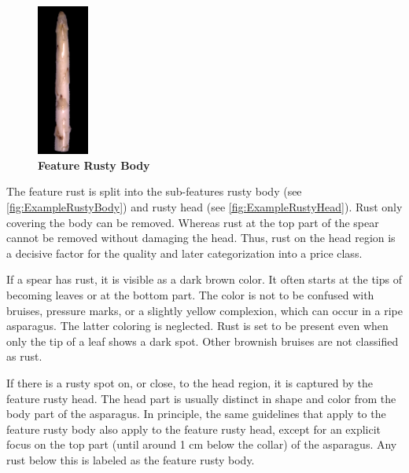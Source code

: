 \begin{figure}
  \begin{center}
    \includegraphics[width=0.15\textwidth]{Figures/chapter03/example_img_rustybody.png}
  \end{center}
  \vspace{-15pt}
  \caption[Example Image Feature Rusty Body]{ \textbf{Feature Rusty Body}}
  \vspace{15pt}
  \label{fig:ExampleRustyBody}
\end{figure}

The feature rust is split into the sub-features rusty body (see \autoref{fig:ExampleRustyBody}) and rusty head (see \autoref{fig:ExampleRustyHead}). Rust only covering the body can be removed. Whereas rust at the top part of the spear cannot be removed without damaging the head. Thus, rust on the head region is a decisive factor for the quality and later categorization into a price class.

If a spear has rust, it is visible as a dark brown color. It often starts at the tips of becoming leaves or at the bottom part. The color is not to be confused with bruises, pressure marks, or a slightly yellow complexion, which can occur in a ripe asparagus. The latter coloring is neglected.
Rust is set to be present even when only the tip of a leaf shows a dark spot. Other brownish bruises are not classified as rust.

If there is a rusty spot on, or close, to the head region, it is captured by the feature rusty head. The head part is usually distinct in shape and color from the body part of the asparagus. In principle, the same guidelines that apply to the feature rusty body also apply to the feature rusty head, except for an explicit focus on the top part (until around 1 cm below the collar) of the asparagus. Any rust below this is labeled as the feature rusty body.

